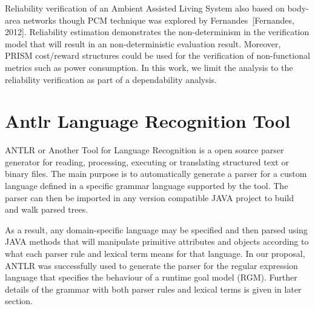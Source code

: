 Reliability verification of an Ambient Assisted Living System also based on body-area networks though PCM technique was explored by Fernandes~[Fernandes, 2012]. Reliability estimation demonstrates the non-determinism in the verification model that will result in an non-deterministic evaluation result. Moreover, PRISM cost/reward structures could be used for the verification of non-functional metrics such as power consumption. In this work, we limit the analysis to the reliability verification as part of a dependability analysis.


\section{Antlr Language Recognition Tool}

ANTLR or Another Tool for Language Recognition is a open source parser generator for reading, processing, executing or translating structured text or binary files. The main purpose is to automatically generate a parser for a custom language defined in a specific grammar language supported by the tool. The parser can then be imported in any version compatible JAVA project to build and walk parsed trees. 

As a result, any domain-specific language may be specified and then parsed using JAVA methods that will manipulate primitive attributes and objects according to what each parser rule and lexical term means for that language. In our proposal, ANTLR was successfully used to generate the parser for the regular expression language that specifies the behaviour of a runtime goal model (RGM). Further details of the grammar with both parser rules and lexical terms is given in later section.
